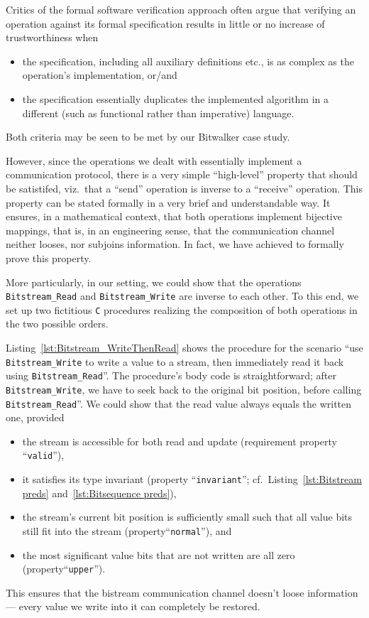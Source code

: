 Critics of the formal software verification approach often 
argue that verifying an operation against its formal specification
results in little or no increase of trustworthiness when
%
\begin{itemize}
\item the specification, including all auxiliary definitions etc., is
	as complex as the operation's implementation, or/and
\item the specification essentially duplicates the implemented
	algorithm in a different (such as functional rather than
	imperative) language.
\end{itemize}
%
Both criteria may be seen to be met by our Bitwalker case study.




However, since the operations we dealt with essentially implement a
communication protocol, there is a very simple ``high-level'' property
that should be satistifed, viz.\ that a ``send'' operation is inverse
to a ``receive'' operation.
%
This property can be stated formally in a very brief and understandable
way.
%
It ensures, in a mathematical context, that both operations implement
bijective mappings, that is, in an engineering sense, that the
communication channel neither looses, nor subjoins information.
%
In fact, we have achieved to formally prove this property.




More particularly, in our setting, we could show that the operations
\lstinline{Bitstream_Read} and \lstinline{Bitstream_Write} are
inverse to each other.
%
To this end, we set up two fictitious \lstinline{C} procedures realizing
the composition of both operations in the two possible orders.




Listing~\ref{lst:Bitstream_WriteThenRead}
shows the procedure for the scenario ``use \lstinline{Bitstream_Write}
to write a value to a stream, then immediately read it back using
\lstinline{Bitstream_Read}''.
%
The procedure's body code is straightforward; after
\lstinline{Bitstream_Write}, we have to seek back to the original bit
position, before calling \lstinline{Bitstream_Read}''.
%
We could show that the read value always equals the written one,
provided
\begin{itemize}
\item the stream is accessible for both read and update
	(requirement property ``\lstinline{valid}''),
\item it satisfies its type invariant (property
	``\lstinline{invariant}''; cf.\ Listing~\ref{lst:Bitstream preds}
	and~\ref{lst:Bitsequence preds}),
\item the stream's current bit position is sufficiently small such that
	all value bits still fit into the stream
	(property``\lstinline{normal}''), and
\item the most significant value bits that are not written are all zero
	(property``\lstinline{upper}'').
\end{itemize}
%
This ensures that the bistream communication channel doesn't loose
information --- every value we write into it can completely be
restored.






